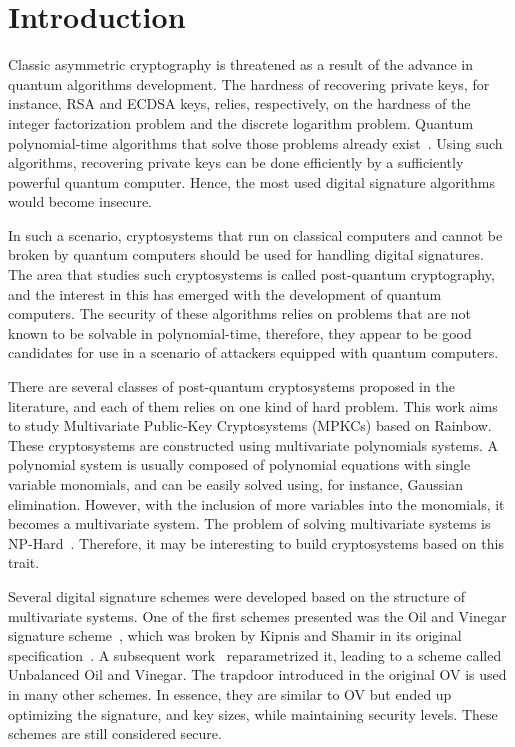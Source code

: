 \documentclass{ufsctex/ufsctex}
\makeatletter
\renewcommand{\listadeabreviaturas}{
	\pretextualchapter{List of Acronyms}\@starttoc{las}}
\makeatother
\begin{document}
\capa{}
\pretextuais{}
\listadefiguras{}
\listadetabelas{}
\listadeabreviaturas{}
\sumario{}

\chapter{Introduction}

Classic asymmetric cryptography is threatened as a result of the advance in
quantum algorithms development. The hardness of recovering private keys, for
instance, RSA and ECDSA keys, relies, respectively, on the hardness
of the integer factorization problem and the discrete logarithm problem.
Quantum polynomial-time algorithms that solve those problems already
exist~\cite{shor1999polynomial}. Using such algorithms, recovering private keys
can be done efficiently by a sufficiently powerful quantum computer. Hence, the
most used digital signature algorithms would become insecure.

In such a scenario, cryptosystems that run on classical computers and cannot be
broken by quantum computers should be used for handling digital signatures. The
area that studies such cryptosystems is called post-quantum cryptography, and
the interest in this has emerged with the development of quantum computers. The
security of these algorithms relies on problems that are not known to be
solvable in polynomial-time, therefore, they appear to be good candidates for
use in a scenario of attackers equipped with quantum computers.

There are several classes of post-quantum cryptosystems proposed in the
literature, and each of them relies on one kind of hard problem. This work aims
to study Multivariate Public-Key Cryptosystems
(MPKCs) based on Rainbow.
These cryptosystems are constructed using multivariate polynomials systems. A
polynomial system is usually composed of polynomial equations with single
variable monomials, and can be easily solved using, for instance, Gaussian
elimination. However, with the inclusion of more variables into the monomials,
it becomes a multivariate system. The problem of solving multivariate systems
is NP-Hard~\cite{garey1979npc}. Therefore, it may be interesting to build
cryptosystems based on this trait.

Several digital signature schemes were developed based on the structure of
multivariate systems. One of the first schemes presented was the Oil and
Vinegar signature scheme~\cite{patarin1997ov}, which
was broken by Kipnis and Shamir in its original
specification~\cite{kipnis1998cryptanalysis}. A subsequent
work~\cite{kipnis1999unbalanced} reparametrized it, leading to a scheme called
Unbalanced Oil and Vinegar. The trapdoor
introduced in the original OV is used in many other schemes. In essence, they
are similar to OV but ended up optimizing the signature, and key sizes, while
maintaining security levels. These schemes are still considered secure.
\end{document}
